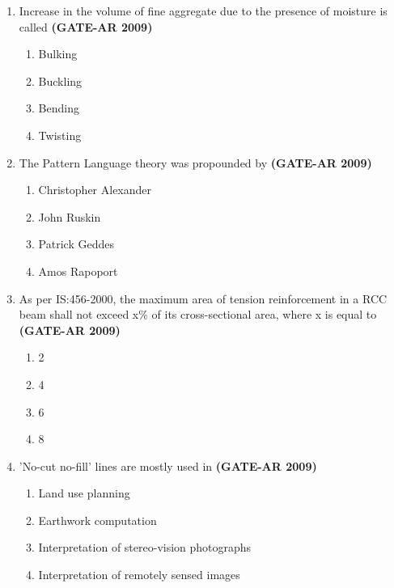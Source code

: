 \documentclass[a4paper,10pt]{article}
\begin{document}
\begin{enumerate}
    \item Increase in the volume of fine aggregate due to the presence of moisture is called \hfill \textbf{(GATE-AR 2009)}
    \begin{multicols}{4}
	\begin{enumerate}
        \item Bulking
        \item Buckling
        \item Bending
        \item Twisting
    \end{enumerate}
	\end{multicols}
    
    \item The Pattern Language theory was propounded by \hfill \textbf{(GATE-AR 2009)}
    \begin{multicols}{2}
	\begin{enumerate}
        \item Christopher Alexander
        \item John Ruskin
        \item Patrick Geddes
        \item Amos Rapoport
    \end{enumerate}
	\end{multicols}
    
    \item As per IS:456-2000, the maximum area of tension reinforcement in a RCC beam shall not exceed x\% of its cross-sectional area, where x is equal to \hfill \textbf{(GATE-AR 2009)}
    \begin{multicols}{4}
	\begin{enumerate}
        \item 2
        \item 4
        \item 6
        \item 8
    \end{enumerate}
	\end{multicols}
    
    \item 'No-cut no-fill' lines are mostly used in \hfill \textbf{(GATE-AR 2009)}
    \begin{multicols}{2}
	\begin{enumerate}
        \item Land use planning
        \item Earthwork computation
        \item Interpretation of stereo-vision photographs
        \item Interpretation of remotely sensed images
    \end{enumerate}
	\end{multicols}
    

\end{enumerate}
\end{document}
